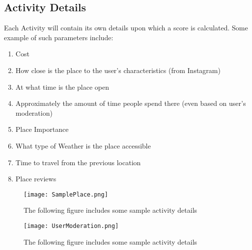         \subsection{Activity Details}
        Each Activity will contain its own details upon which a
        score is calculated. Some example of such parameters include:
        \begin{enumerate}
            \item Cost
            \item How close is the place to the user’s characteristics (from Instagram)
            \item At what time is the place open
            \item Approximately the amount of time people spend there (even based on user’s moderation)
            \item Place Importance
            \item What type of Weather is the place accessible
            \item Time to travel from the previous location
            \item Place reviews
            
        \end{enumerate}

        \begin{figure}[H]
            \caption{The following figure includes some sample activity details}
            \centering
            \texttt{[image: SamplePlace.png]}
            \label{dataset}
        \end{figure}

        \begin{figure}[H]
            \caption{The following figure includes some sample activity details}
            \centering
            \texttt{[image: UserModeration.png]}
            \label{dataset}
        \end{figure}